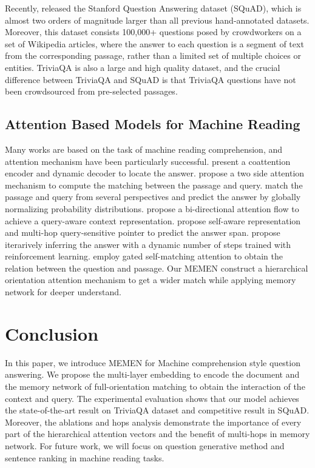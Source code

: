 \documentclass[letterpaper]{article}
\begin{document}
Recently, \citet{rajpurkar2016squad} released the Stanford Question Answering dataset (SQuAD), which is almost two orders of magnitude larger than all previous hand-annotated datasets. Moreover, this dataset consists 100,000+ questions posed by crowdworkers on a set of Wikipedia articles, where the answer to each question is a segment of text from the corresponding passage, rather than a limited set of multiple choices or entities. TriviaQA \citep{joshi2017triviaqa} is also a large and high quality dataset, and the crucial difference between TriviaQA and SQuAD is that TriviaQA questions have not been crowdsourced from pre-selected passages.

\subsection{Attention Based Models for Machine Reading}
Many works are based on the task of machine reading comprehension, and attention mechanism have been particularly successful\citep{xiong2016dynamic,cui2016attention,wang2016multi,seo2016bidirectional,hu2017mnemonic,shen2016reasonet,rnet}. \citet{xiong2016dynamic} present a coattention encoder and dynamic decoder to locate the answer. \citet{cui2016attention} propose a two side attention mechanism to compute the matching between the passage and query. \citet{wang2016multi} match the passage and query from several perspectives and predict the answer by globally normalizing probability distributions. \citet{seo2016bidirectional} propose a bi-directional attention flow to achieve a query-aware context representation.  \citet{hu2017mnemonic} propose self-aware representation and multi-hop query-sensitive pointer to predict the answer span. \citet{shen2016reasonet} propose iterarively inferring the answer with a dynamic number of steps trained with reinforcement learning. \citet{rnet} employ gated self-matching attention to obtain the relation between the question and passage. Our MEMEN construct a hierarchical orientation attention mechanism to get a wider match while applying memory network\citep{sukhbaatar2015end} for deeper understand.






\section{Conclusion}
In this paper, we introduce MEMEN for Machine comprehension style question answering. We propose the multi-layer embedding to encode the document and the memory network of full-orientation matching to obtain the interaction of the context and query.  The experimental evaluation shows that our model achieves the state-of-the-art result on TriviaQA dataset and competitive result in SQuAD. Moreover, the ablations and hops analysis demonstrate the importance of every part of the hierarchical attention vectors and the benefit of multi-hops in memory network. For future work, we will focus on question generative method and sentence ranking in machine reading tasks.





\end{document}
